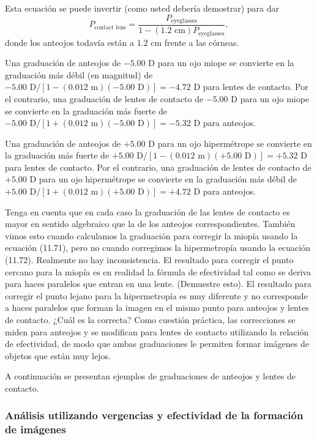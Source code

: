 \documentclass[12pt]{book}
\begin{document}
Esta ecuación se puede invertir (como usted debería demostrar) para dar
\begin{equation}
P_{\text{contact lens}} = \frac{P_{\text{eyeglasses}}}{1 - (1.2\text{ cm})P_{\text{eyeglasses}}},
\label{eq:11.74}
\end{equation}
donde los anteojos todavía están a $1.2\text{ cm}$ frente a las córneas.

Una graduación de anteojos de $-5.00\text{ D}$ para un ojo miope se convierte en la graduación más débil (en magnitud) de $-5.00\text{ D}/[1 - (0.012\text{ m})(-5.00\text{ D})] = -4.72\text{ D}$ para lentes de contacto. Por el contrario, una graduación de lentes de contacto de $-5.00\text{ D}$ para un ojo miope se convierte en la graduación más fuerte de $-5.00\text{ D}/[1 + (0.012\text{ m})(-5.00\text{ D})] = -5.32\text{ D}$ para anteojos.

Una graduación de anteojos de $+5.00\text{ D}$ para un ojo hipermétrope se convierte en la graduación más fuerte de $+5.00\text{ D}/[1 - (0.012\text{ m})(+5.00\text{ D})] = +5.32\text{ D}$ para lentes de contacto. Por el contrario, una graduación de lentes de contacto de $+5.00\text{ D}$ para un ojo hipermétrope se convierte en la graduación más débil de $+5.00\text{ D}/[1 + (0.012\text{ m})(+5.00\text{ D})] = +4.72\text{ D}$ para anteojos.

Tenga en cuenta que en cada caso la graduación de las lentes de contacto es mayor en sentido algebraico que la de los anteojos correspondientes. También vimos esto cuando calculamos la graduación para corregir la miopía usando la ecuación (11.71), pero no cuando corregimos la hipermetropía usando la ecuación (11.72). Realmente no hay inconsistencia. El resultado para corregir el punto cercano para la miopía es en realidad la fórmula de efectividad tal como se deriva para haces paralelos que entran en una lente. (Demuestre esto). El resultado para corregir el punto lejano para la hipermetropía es muy diferente y no corresponde a haces paralelos que forman la imagen en el mismo punto para anteojos y lentes de contacto. ¿Cuál es la correcta? Como cuestión práctica, las correcciones se miden para anteojos y se modifican para lentes de contacto utilizando la relación de efectividad, de modo que ambas graduaciones le permiten formar imágenes de objetos que están muy lejos.

A continuación se presentan ejemplos de graduaciones de anteojos y lentes de contacto.

\subsubsection*{Análisis utilizando vergencias y efectividad de la formación de imágenes}
\end{document}
